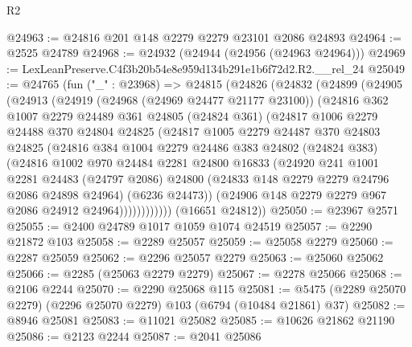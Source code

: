 \begin{lexlean}{R2}
\begin{coremodule}
@24963 := @24816 @201 @148 @2279 @2279 @23101 @2086 @24893
@24964 := @2525 @24789
@24968 := @24932 (@24944 (@24956 (@24963 @24964)))
@24969 := LexLeanPreserve.C4f3b20b54e8e959d134b291e1b6f72d2.R2.__rel_24
@25049 := @24765
    (fun ("_" : @23968) =>
    @24815
      (@24826
        (@24832
          (@24899
            (@24905
              (@24913
                (@24919
                  (@24968 (@24969 @24477 @21177 @23100))
                  (@24816
                    @362
                    @1007
                    @2279
                    @24489
                    @361
                    @24805
                    (@24824 @361)
                    (@24817
                      @1006
                      @2279
                      @24488
                      @370
                      @24804
                      @24825
                      (@24817
                        @1005
                        @2279
                        @24487
                        @370
                        @24803
                        @24825
                        (@24816
                          @384
                          @1004
                          @2279
                          @24486
                          @383
                          @24802
                          (@24824 @383)
                          (@24816
                            @1002
                            @970
                            @24484
                            @2281
                            @24800
                            @16833
                            (@24920
                              @241
                              @1001
                              @2281
                              @24483
                              (@24797 @2086)
                              @24800
                              (@24833 @148 @2279 @2279 @24796 @2086 @24898 @24964)
                              (@6236 @24473))
                            (@24906 @148 @2279 @2279 @967 @2086 @24912 @24964))))))))))))
      (@16651 @24812))
@25050 := @23967 @2571
@25055 := @2400 @24789 @1017 @1059 @1074 @24519
@25057 := @2290 @21872 @103
@25058 := @2289 @25057
@25059 := @25058 @2279
@25060 := @2287 @25059
@25062 := @2296 @25057 @2279
@25063 := @25060 @25062
@25066 := @2285 (@25063 @2279 @2279)
@25067 := @2278 @25066
@25068 := @2106 @2244
@25070 := @2290 @25068 @115
@25081 := @5475 (@2289 @25070 @2279) (@2296 @25070 @2279) @103 (@6794 (@10484 @21861) @37)
@25082 := @8946 @25081
@25083 := @11021 @25082
@25085 := @10626 @21862 @21190
@25086 := @2123 @2244
@25087 := @2041 @25086

\end{coremodule}
\end{lexlean}
